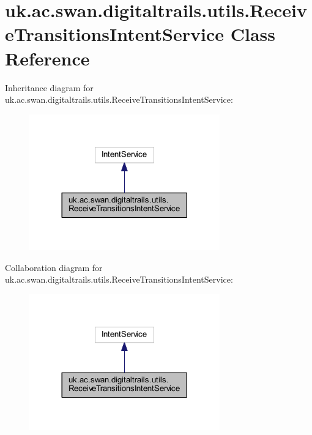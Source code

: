\hypertarget{classuk_1_1ac_1_1swan_1_1digitaltrails_1_1utils_1_1_receive_transitions_intent_service}{\section{uk.\+ac.\+swan.\+digitaltrails.\+utils.\+Receive\+Transitions\+Intent\+Service Class Reference}
\label{classuk_1_1ac_1_1swan_1_1digitaltrails_1_1utils_1_1_receive_transitions_intent_service}
}


Inheritance diagram for uk.\+ac.\+swan.\+digitaltrails.\+utils.\+Receive\+Transitions\+Intent\+Service\+:\nopagebreak
\begin{figure}[H]
\begin{center}
\leavevmode
\includegraphics[width=233pt]{classuk_1_1ac_1_1swan_1_1digitaltrails_1_1utils_1_1_receive_transitions_intent_service__inherit__graph}
\end{center}
\end{figure}


Collaboration diagram for uk.\+ac.\+swan.\+digitaltrails.\+utils.\+Receive\+Transitions\+Intent\+Service\+:\nopagebreak
\begin{figure}[H]
\begin{center}
\leavevmode
\includegraphics[width=233pt]{classuk_1_1ac_1_1swan_1_1digitaltrails_1_1utils_1_1_receive_transitions_intent_service__coll__graph}
\end{center}
\end{figure}
